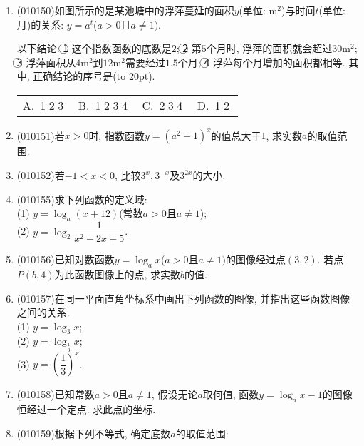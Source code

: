 \documentclass[10pt,a4paper]{article}
\newcommand{\bracket}[1]{(\hbox to #1pt{})}
\newcommand{\fourch}[4]{\par\begin{tabular}{p{.23\textwidth}p{.23\textwidth}p{.23\textwidth}p{.23\textwidth}}
A.~#1 &B.~#2& C.~#3& D.~#4
\end{tabular}}
\begin{document}
\begin{enumerate}[1.]
{}
\item {\tiny (010150)}如图所示的是某池塘中的浮萍蔓延的面积$y$(单位: $\text{m}^2$)与时间$t$(单位: 月)的关系: $y=a^t$($a>0$且$a\ne 1)$. 
\begin{center}
\end{center}
以下结论:
\textcircled{1} 这个指数函数的底数是$2$; 
\textcircled{2} 第$5$个月时, 浮萍的面积就会超过$30\text{m}^2$;
\textcircled{3} 浮萍面积从$4\text{m}^2$到$12\text{m}^2$需要经过$1.5$个月;
\textcircled{4} 浮萍每个月增加的面积都相等. 其中, 正确结论的序号是\bracket{20}.
\fourch{\textcircled{1}\textcircled{2}\textcircled{3}}{\textcircled{1}\textcircled{2}\textcircled{3}\textcircled{4}}{\textcircled{2}\textcircled{3}\textcircled{4}}{\textcircled{1}\textcircled{2}}
\item {\tiny (010151)}若$x>0$时, 指数函数$y=(a^2-1)^x$的值总大于$1$, 求实数$a$的取值范围.
\item {\tiny (010152)}若$-1<x<0$, 比较$3^x, 3^{-x}$及$3^{2x}$的大小.
\item {\tiny (010155)}求下列函数的定义域:\\
(1) $y=\log_a (x+12)$(常数$a>0$且$a\ne 1$);\\
(2) $y=\log_2\dfrac1{x^2-2x+5}$.
\item {\tiny (010156)}已知对数函数$y=\log_ax$($a>0$且$a\ne 1)$的图像经过点$(3, 2)$. 若点$P(b, 4)$为此函数图像上的点, 求实数$b$的值.
\item {\tiny (010157)}在同一平面直角坐标系中画出下列函数的图像, 并指出这些函数图像之间的关系.\\
(1) $y=\log_3x$;\\
(2) $y=\log_{\frac 13}x$;\\
(3) $y=(\dfrac 13)^x$.
\item {\tiny (010158)}已知常数$a>0$且$a\ne 1$, 假设无论$a$取何值, 函数$y=\log_ax-1$的图像恒经过一个定点. 求此点的坐标.
\item {\tiny (010159)}根据下列不等式, 确定底数$a$的取值范围:\\

\end{enumerate}
\end{document}
